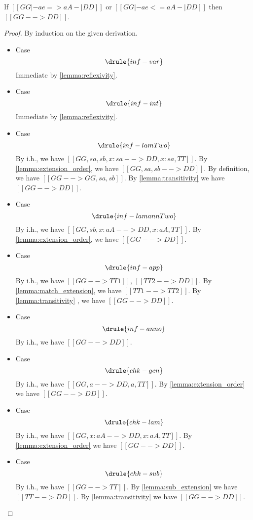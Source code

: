 \begin{lemma}   \label{lemma:typing_extension}
  If $ [[GG |- ae => aA -| DD]] $ or $ [[ GG |- ae <= aA -| DD  ]]  $ then $[[ GG --> DD]]$.
\end{lemma}
\begin{proof}
  By induction on the given derivation.

  \begin{itemize}
  \item Case \[ \drule{inf-var}  \] Immediate by \cref{lemma:reflexivity}.

  \item Case \[  \drule{inf-int}  \] Immediate by \cref{lemma:reflexivity}.

  \item Case \[ \drule{inf-lamTwo}   \]
    By i.h., we have $[[ GG, sa, sb, x : sa --> DD, x : sa, TT  ]]$. By \cref{lemma:extension_order}, we have
    $[[ GG, sa, sb --> DD  ]]$. By definition, we have $[[  GG --> GG, sa, sb  ]]$. By \cref{lemma:transitivity}
    we have $[[ GG --> DD ]]$.

  \item Case \[  \drule{inf-lamannTwo}  \]
    By i.h., we have $[[ GG, sb, x : aA --> DD, x : aA, TT  ]]   $. By \cref{lemma:extension_order},
    we have $[[GG --> DD]]$.

  \item Case \[ \drule{inf-app}   \]
    By i.h., we have $[[  GG --> TT1  ]]$, $[[ TT2 --> DD]]$. By \cref{lemma:match_extension},
    we have $[[ TT1 --> TT2  ]]$. By \cref{lemma:transitivity} , we have
    $[[GG --> DD]]$.


  \item Case \[ \drule{inf-anno}   \]
    By i.h., we have $[[ GG --> DD ]]$.

  \item Case \[ \drule{chk-gen}   \]
    By i.h., we have $[[  GG, a --> DD, a, TT  ]]$. By
    \cref{lemma:extension_order} we have $[[ GG --> DD]]$.

  \item Case \[ \drule{chk-lam} \]
    By i.h., we have $[[GG , x : aA --> DD, x : aA, TT]]$.
    By \cref{lemma:extension_order} we have $[[GG --> DD]]$.

  \item Case \[ \drule{chk-sub} \]
    By i.h., we have $[[GG --> TT]]$. By
    \cref{lemma:sub_extension} we have $[[TT --> DD]]$. By
    \cref{lemma:transitivity} we have $[[GG --> DD]]$.
  \end{itemize}

\end{proof}

